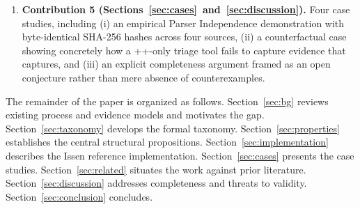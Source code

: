 \begin{enumerate}
    \item \textbf{Contribution 5 (Sections~\ref{sec:cases}~and~\ref{sec:discussion}).}
    Four case studies, including (i) an empirical Parser Independence
    demonstration with byte-identical SHA-256 hashes across four sources,
    (ii) a counterfactual case showing concretely how a ++-only
    triage tool fails to capture evidence that  captures, and (iii)
    an explicit completeness argument framed as an open conjecture rather
    than mere absence of counterexamples.
\end{enumerate}

The remainder of the paper is organized as follows. Section~\ref{sec:bg}
reviews existing process and evidence models and motivates the gap.
Section~\ref{sec:taxonomy} develops the formal taxonomy.
Section~\ref{sec:properties} establishes the central structural propositions.
Section~\ref{sec:implementation} describes the Issen reference
implementation. Section~\ref{sec:cases} presents the case studies.
Section~\ref{sec:related} situates the work against prior literature.
Section~\ref{sec:discussion} addresses completeness and threats to validity.
Section~\ref{sec:conclusion} concludes.
